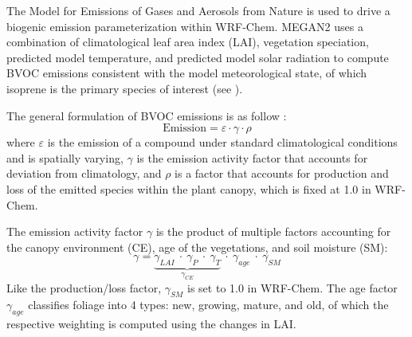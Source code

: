 	The Model for Emissions of Gases and Aerosols from Nature \citep[MEGAN2;][]{Guenther:2006kl}
	is used to drive a biogenic emission parameterization within WRF-Chem. MEGAN2 uses a combination of climatological leaf
	area index (LAI), vegetation speciation, predicted model temperature, and predicted model solar radiation to compute BVOC emissions consistent
	with the model meteorological state, of which isoprene is the primary species of interest (see ).
	
	The general formulation of BVOC emissions is as follow \citep[after][]{Guenther:2006kl}:
	\begin{equation}\label{eqn:MEGAN-E}
		\mathrm{Emission} =\varepsilon\cdot\gamma\cdot\rho
	\end{equation}
	where $\varepsilon$ is the emission of a compound under standard climatological conditions and is spatially varying,  $\gamma$ is the emission activity factor that accounts for deviation from climatology, and $\rho$ is a factor that accounts for production and loss of the emitted species within the plant canopy, which is fixed at 1.0 in WRF-Chem.
	
	The emission activity factor $\gamma$ is the product of multiple factors accounting for the canopy environment (CE), age of the vegetations, and soil moisture (SM):
	\begin{equation}\label{eqn:MEGAN-gamma}
		\gamma = \underbrace{\gamma_{LAI}~\cdot~\gamma_P~\cdot~\gamma_T}_{\gamma_{CE}}~\cdot~\gamma_{age}~\cdot~\gamma_{SM}
	\end{equation}
	Like the production/loss factor, $\gamma_{SM}$ is set to 1.0 in WRF-Chem. The age factor $\gamma_{age}$ classifies foliage into 4 types: new, growing, mature, and old, of which the respective weighting is computed using the changes in LAI.
	
